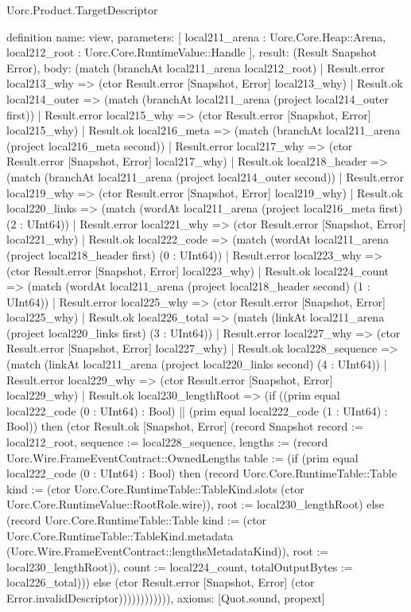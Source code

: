 \begin{lexlean}{Uorc.Product.TargetDescriptor}
\begin{semanticmodule}
definition{
  name: view,
  parameters: [
    local211_arena : Uorc.Core.Heap::Arena,
    local212_root : Uorc.Core.RuntimeValue::Handle
  ],
  result: (Result Snapshot Error),
  body: (match (branchAt local211_arena local212_root)
    | Result.error local213_why => (ctor Result.error [Snapshot, Error] local213_why)
    | Result.ok local214_outer => (match (branchAt local211_arena (project local214_outer first))
      | Result.error local215_why => (ctor Result.error [Snapshot, Error] local215_why)
      | Result.ok local216_meta => (match (branchAt local211_arena (project local216_meta second))
        | Result.error local217_why => (ctor Result.error [Snapshot, Error] local217_why)
        | Result.ok local218_header => (match (branchAt local211_arena (project local214_outer second))
          | Result.error local219_why => (ctor Result.error [Snapshot, Error] local219_why)
          | Result.ok local220_links => (match (wordAt local211_arena (project local216_meta first) (2 : UInt64))
            | Result.error local221_why => (ctor Result.error [Snapshot, Error] local221_why)
            | Result.ok local222_code => (match (wordAt local211_arena (project local218_header first) (0 : UInt64))
              | Result.error local223_why => (ctor Result.error [Snapshot, Error] local223_why)
              | Result.ok local224_count => (match (wordAt local211_arena (project local218_header second) (1 : UInt64))
                | Result.error local225_why => (ctor Result.error [Snapshot, Error] local225_why)
                | Result.ok local226_total => (match (linkAt local211_arena (project local220_links first) (3 : UInt64))
                  | Result.error local227_why => (ctor Result.error [Snapshot, Error] local227_why)
                  | Result.ok local228_sequence => (match (linkAt local211_arena (project local220_links second) (4 : UInt64))
                    | Result.error local229_why => (ctor Result.error [Snapshot, Error] local229_why)
                    | Result.ok local230_lengthRoot => (if ((prim equal local222_code (0 : UInt64) : Bool) || (prim equal local222_code (1 : UInt64) : Bool)) then (ctor Result.ok [Snapshot, Error] (record Snapshot {record := local212_root, sequence := local228_sequence, lengths := (record Uorc.Wire.FrameEventContract::OwnedLengths {table := (if (prim equal local222_code (0 : UInt64) : Bool) then (record Uorc.Core.RuntimeTable::Table {kind := (ctor Uorc.Core.RuntimeTable::TableKind.slots (ctor Uorc.Core.RuntimeValue::RootRole.wire)), root := local230_lengthRoot}) else (record Uorc.Core.RuntimeTable::Table {kind := (ctor Uorc.Core.RuntimeTable::TableKind.metadata (Uorc.Wire.FrameEventContract::lengthsMetadataKind)), root := local230_lengthRoot})), count := local224_count, totalOutputBytes := local226_total})})) else (ctor Result.error [Snapshot, Error] (ctor Error.invalidDescriptor)))))))))))),
  axioms: [Quot.sound, propext]
}


\end{semanticmodule}
\end{lexlean}

